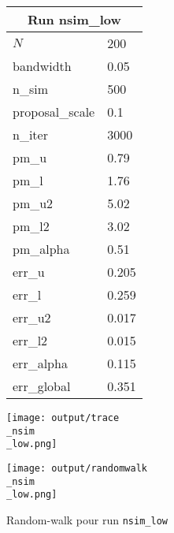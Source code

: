 
\begin{figure}[H]
  \centering
  \begin{minipage}[t]{0.45\textwidth}
    \vspace{0pt}
    \footnotesize
    \begin{tabular}{|l|l|}\hline
    \multicolumn{2}{|c|}{\textbf{Run nsim\_low}} \\ \hline
    $N$ & 200 \\ \hline
    bandwidth & 0.05 \\ \hline
    n\_sim & 500 \\ \hline
    proposal\_scale & 0.1 \\ \hline
    n\_iter & 3000 \\ \hline
    pm\_u & 0.79 \\ \hline
    pm\_l & 1.76 \\ \hline
    pm\_u2 & 5.02 \\ \hline
    pm\_l2 & 3.02 \\ \hline
    pm\_alpha & 0.51 \\ \hline
    err\_u & 0.205 \\ \hline
    err\_l & 0.259 \\ \hline
    err\_u2 & 0.017 \\ \hline
    err\_l2 & 0.015 \\ \hline
    err\_alpha & 0.115 \\ \hline
    err\_global & 0.351 \\ \hline
    \end{tabular}
  \end{minipage}
  \hfill
  \begin{minipage}[t]{0.45\textwidth}
    \vspace{0pt}
    \texttt{[image: output/trace\\\_nsim\\\_low.png]}
  \end{minipage}
\end{figure}

\begin{figure}[H]
  \centering
  \texttt{[image: output/randomwalk\\\_nsim\\\_low.png]}
  \caption{Random-walk pour run \texttt{nsim\_low}}
\end{figure}

